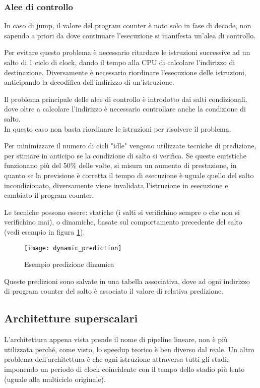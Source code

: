 \documentclass[../template]{subfiles}
\begin{document}
\subsubsection{Alee di controllo}
In caso di jump, il valore del program counter è noto solo in fase di decode, non sapendo a priori da dove continuare l'esecuzione si manifesta un'alea di controllo.

Per evitare questo problema è necessario ritardare le istruzioni successive ad un salto di 1 ciclo di clock, dando il tempo alla CPU di calcolare l'indirizzo di destinazione.
Diversamente è necessario riordinare l'esecuzione delle istruzioni, anticipando la decodifica dell'indirizzo di un'istruzione.

Il problema principale delle alee di controllo è introdotto dai salti condizionali, dove oltre a calcolare l'indirizzo è necessario controllare anche la condizione di salto.
\\
In questo caso non basta riordinare le istruzioni per risolvere il problema.

Per minimizzare il numero di cicli "idle" vengono utilizzate tecniche di predizione, per stimare in anticipo se la condizione di salto si verifica.
Se queste euristiche funzionano più del 50\% delle volte, si misura un aumento di prestazione, in quanto se la previsione è corretta il tempo di esecuzione è uguale quello del salto incondizionato, diversamente viene invalidata l'istruzione in esecuzione e cambiato il program counter.

Le tecniche possono essere: statiche (i salti si verifichino sempre o che non si verifichino mai), o dinamiche, basate sul comportamento precedente del salto (vedi esempio in figura \ref{fig:dynamic_prediction}).

\begin{figure}[h]
    \centering
    \texttt{[image: dynamic\_prediction]}
    \caption{Esempio predizione dinamica}
    \label{fig:dynamic_prediction}
\end{figure}

Queste predizioni sono salvate in una tabella associativa, dove ad ogni indirizzo di program counter del
salto è associato il valore di relativa predizione.

\subsection{Architetture superscalari}
L'architettura appena vista prende il nome di pipeline lineare, non è più utilizzata perché, come visto, lo speedup teorico è ben diverso dal reale.
Un altro problema dell'architettura è che ogni istruzione attraversa tutti gli stadi, imponendo un periodo di clock coincidente con il tempo dello stadio più lento (uguale alla multiciclo originale).
\end{document}
